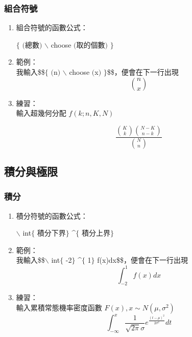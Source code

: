 \subsubsection{組合符號}
\begin{enumerate}
\item 組合符號的函數公式：\\
\begin{center}
$\{$ $($總數$)$ $\backslash$ choose $($取的個數$)$ $\}$
\end{center}
\item 範例：\\
我輸入\$\$$\{$ $($n$)$ $\backslash$ choose $($x$)$ $\}$\$\$，便會在下一行出現$$ {n\choose x}$$
\item 練習：\\
輸入超幾何分配 $f(k;n,K,N)$
\begin{center}\label{frac3}
$$\frac{{K\choose k}{N-K\choose n-k}}{{N\choose n}}$$
\end{center}
\end{enumerate}
\subsection{積分與極限}
\subsubsection{積分}
\begin{enumerate}
\item 積分符號的函數公式：\\
\begin{center}
$\backslash$ int\textunderscore  $\{$ 積分下界$\}$  \textasciicircum $\{$ 積分上界$\}$
\end{center}
\item 範例：\\
我輸入\$\$$\backslash$ int\textunderscore  $\{$ -2$\}$  \textasciicircum $\{$ 1$\}$ f(x)dx\$\$，便會在下一行出現$$\int_{-2}^{1}f(x)dx$$
\item 練習：\\
輸入累積常態機率密度函數 $F(x), x\sim N(\mu, \sigma^2)$
\begin{equation}\label{int1}
\int_{-\infty}^{x}\frac{1}{\sqrt{2\pi}\sigma}e^\frac{(t-\mu)^2}{2\sigma^2}dt
\end{equation}

\end{enumerate}
